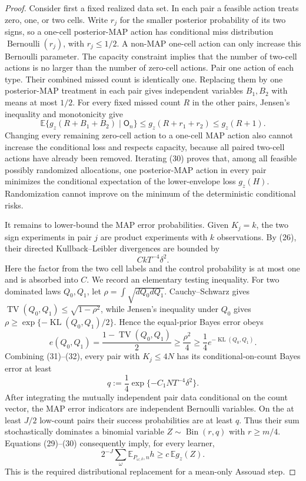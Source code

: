 \documentclass{article}
\begin{document}
\begin{proof}
Consider first a fixed realized data set.  In each pair a feasible action treats zero, one, or two cells.  Write \(r_j\) for the smaller posterior probability of its two signs, so a one-cell posterior-MAP action has conditional miss distribution \(\operatorname{Bernoulli}(r_j)\), with \(r_j\leq1/2\).  A non-MAP one-cell action can only increase this Bernoulli parameter.  The capacity constraint implies that the number of two-cell actions is no larger than the number of zero-cell actions.  Pair one action of each type.  Their combined missed count is identically one.  Replacing them by one posterior-MAP treatment in each pair gives independent variables \(B_1,B_2\) with means at most \(1/2\).  For every fixed missed count \(R\) in the other pairs, Jensen's inequality and monotonicity give
\[
\mathbb E\{g_z(R+B_1+B_2)\mid\mathsf O_n\}
\leq g_z(R+r_1+r_2)\leq g_z(R+1).                                 \tag{30}
\]
Changing every remaining zero-cell action to a one-cell MAP action also cannot increase the conditional loss and respects capacity, because all paired two-cell actions have already been removed.  Iterating (30) proves that, among all feasible possibly randomized allocations, one posterior-MAP action in every pair minimizes the conditional expectation of the lower-envelope loss \(g_z(H)\).  Randomization cannot improve on the minimum of the deterministic conditional risks.

It remains to lower-bound the MAP error probabilities.  Given \(K_j=k\), the two sign experiments in pair \(j\) are product experiments with \(k\) observations.  By (26), their directed Kullback--Leibler divergences are bounded by
\[
CkT^{-4}\delta^2.                                                   \tag{31}
\]
Here the factor from the two cell labels and the control probability is at most one and is absorbed into \(C\).  We record an elementary testing inequality.  For two dominated laws \(Q_0,Q_1\), let
\(\rho=\int\sqrt{dQ_0dQ_1}\).  Cauchy--Schwarz gives
\(\operatorname{TV}(Q_0,Q_1)\leq\sqrt{1-\rho^2}\), while Jensen's inequality under \(Q_0\) gives
\(\rho\geq\exp\{-\operatorname{KL}(Q_0,Q_1)/2\}\).  Hence the equal-prior Bayes error obeys
\[
e(Q_0,Q_1)=\frac{1-\operatorname{TV}(Q_0,Q_1)}2
\geq\frac{\rho^2}{4}
\geq\frac14e^{-\operatorname{KL}(Q_0,Q_1)}.                       \tag{32}
\]
Combining (31)--(32), every pair with \(K_j\leq4N\) has its conditional-on-count Bayes error at least
\[
q:=\frac14\exp\{-C_1NT^{-4}\delta^2\}.                            \tag{33}
\]
After integrating the mutually independent pair data conditional on the count vector, the MAP error indicators are independent Bernoulli variables.  On the at least \(J/2\) low-count pairs their success probabilities are at least \(q\).  Thus their sum stochastically dominates a binomial variable \(Z\sim\operatorname{Bin}(r,q)\) with \(r\geq m/4\).  Equations (29)--(30) consequently imply, for every learner,
\[
2^{-J}\sum_{\omega}\mathbb E_{P_{\omega,\delta},n}h
\geq c\,\mathbb E g_z(Z).                                          \tag{34}
\]
This is the required distributional replacement for a mean-only Assouad step.


\end{proof}
\end{document}
